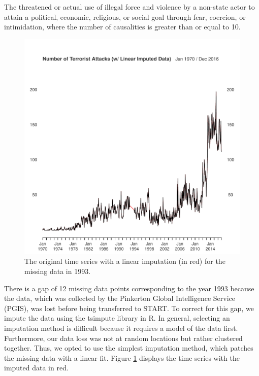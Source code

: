 \documentclass[11pt]{paper}
\begin{document}
\begin{mydef}
The threatened or actual use of illegal force and violence by a non-state actor to attain a political, economic, religious, or social goal through fear, coercion, or intimidation, where the number of causalities is greater than or equal to 10.
\end{mydef}

\begin{figure}
\centering
\includegraphics[width=0.75\linewidth]{../image/og_ts.pdf}
\caption{The original time series with a linear imputation (in red) for the missing data in 1993.}
\label{og}
\end{figure}


There is a gap of 12 missing data points corresponding to the year 1993 because the data, which was collected by the Pinkerton Global Intelligence Service (PGIS), was lost before being transferred to START. To correct for this gap, we impute the data using the tsimpute library in R. In general, selecting an imputation method is difficult because it requires a model of the data first. Furthermore, our data loss was not at random locations but rather clustered together. Thus, we opted to use the simplest imputation method, which patches the missing data with a linear fit. Figure \ref{og} displays the time series with the imputed data in red.

\end{document}
